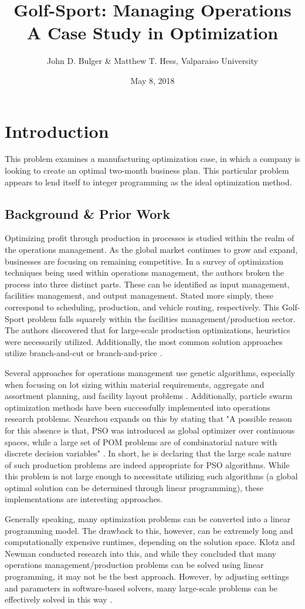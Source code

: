 \documentclass{article}
\title{Golf-Sport:  Managing Operations \\ A Case Study in Optimization}
\date{May 8, 2018}
\author{John D. Bulger \& Matthew T. Hess, Valparaiso University}
\begin{document}
	\maketitle
	\newpage
\section{Introduction}
This problem examines a manufacturing optimization case, in which a company is looking to create an optimal two-month business plan.  This particular problem appears to lend itself to integer programming as the ideal optimization method.
\subsection{Background \& Prior Work}
Optimizing profit through production in processes is studied within the realm of the operations management.  As the global market continues to grow and expand, businesses are focusing on remaining competitive.  In a survey of 
optimization techniques being used within operations management, the authors broken the process into three distinct parts.  These can be identified as input management, facilities management, and output management.  Stated more simply, these correspond to 
scheduling, production, and vehicle routing, respectively.  This Golf-Sport problem falls squarely within the facilities management/production sector.  The authors discovered that for large-scale production optimizations, heuristics were necessarily utilized.  
Additionally, the most common solution approaches utilize branch-and-cut or branch-and-price \cite{survey}.
\par
Several approaches for operations management use genetic algorithms, especially when focusing on lot sizing within material requirements, aggregate and assortment planning, and facility layout problems \cite{gen}.  
Additionally, particle swarm optimization methods have been successfully implemented into operations research problems.  Nearchou expands on this by stating that "A possible reason for this absence is that, PSO was introduced as global optimizer over continuous spaces, while a large set of POM problems are of combinatorial nature with discrete decision variables" \cite{and}.  In short, he is declaring that the large scale nature of such production problems are indeed appropriate for PSO algorithms.  
While this problem is not large enough to necessitate utilizing such algorithms (a global optimal solution can be determined through linear programming), these implementations are interesting approaches.
\par
Generally speaking, many optimization problems can be converted into a linear programming model.  The drawback to this, however, can be extremely long and computationally expensive runtimes, depending on the solution space.  Klotz and Newman conducted research into this, and 
while they concluded that many operations management/production problems can be solved using linear programming, it may not be the best approach.  However, by adjusting settings and parameters in software-based solvers, many large-scale problems can be effectively solved in this way \cite{klotz}. 
\end{document}

